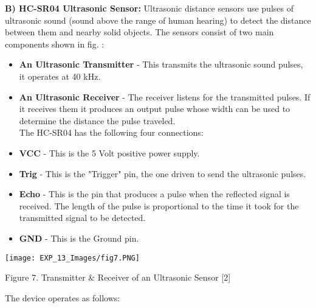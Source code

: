 \documentclass[12pt,a4paper]{article}
\begin{document}
\begin{justify}
\noindent \textbf{B) HC-SR04 Ultrasonic Sensor: } Ultrasonic distance sensors use pulses of ultrasonic sound (sound above the range of human hearing) to detect the distance between them and nearby solid objects. The sensors consist of two main components shown in fig. :
\vspace{-4mm}
   \begin{itemize}
   \setlength\itemsep{-0.3em}
    \item \textbf{An Ultrasonic Transmitter} - This transmits the ultrasonic sound pulses, it operates at 40 kHz.
    \item \textbf{An Ultrasonic Receiver} - The receiver listens for the transmitted pulses. If it receives them it produces an output pulse whose width can be used to determine the distance the pulse traveled.\\[6pt] 
    The HC-SR04 has the following four connections:
    \item \textbf{VCC} - This is the 5 Volt positive power supply.
    \item \textbf{Trig} - This is the "Trigger" pin, the one driven to send the ultrasonic pulses.
    \item \textbf{Echo} - This is the pin that produces a pulse when the reflected signal is received. The length of the pulse is proportional to the time it took for the transmitted signal to be detected.
   \item \textbf{GND} - This is the Ground pin.
   \end{itemize}

\begin{center} 
\texttt{[image: EXP\_13\_Images/fig7.PNG]}
\end{center}
\begin{center} {Figure 7. Transmitter \& Receiver of an Ultrasonic Sensor [2]}\end{center}

\noindent The device operates as follows:


\end{justify}
\end{document}

